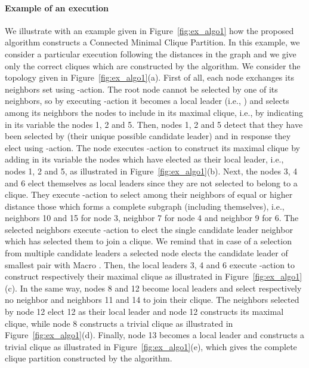 \documentclass[11pt,letterpaper,onecolumn]{article}
\begin{document}
\paragraph{Example of an execution}

We illustrate with an example given in Figure~\ref{fig:ex_algo1} how the proposed algorithm  constructs a Connected Minimal Clique Partition. In this example, we consider a particular execution following the distances in the graph and we give only the correct cliques which are constructed by the algorithm. We consider the topology given in Figure~\ref{fig:ex_algo1}(a). First of all, each node exchanges its neighbors set using -action. The root node  cannot be selected by one of its neighbors, so by executing -action it becomes a local leader (i.e., ) and selects among its neighbors the nodes to include in its maximal clique, i.e., by indicating in its variable  the nodes 1, 2 and 5. Then, nodes 1, 2 and 5 detect that they have been selected by  (their unique possible candidate leader) and in response they elect  using -action. The node  executes -action to construct its maximal clique by adding in its variable  the nodes which have elected  as their local leader, i.e., nodes 1, 2 and 5, as illustrated in Figure~\ref{fig:ex_algo1}(b). Next, the nodes 3, 4 and 6 elect themselves as local leaders since they are not selected to belong to a clique. They execute -action to select among their neighbors of equal or higher distance those which forms a complete subgraph (including themselves), i.e., neighbors 10 and 15 for node 3, neighbor 7 for node 4 and neighbor 9 for 6. The selected neighbors execute -action to elect the single candidate leader neighbor which has selected them to join a clique. We remind that in case of a selection from multiple candidate leaders a selected node elects the candidate leader  of smallest pair  with Macro . Then, the local leaders 3, 4 and 6 execute -action to construct respectively their maximal clique as illustrated in Figure~\ref{fig:ex_algo1}(c). In the same way, nodes 8 and 12 become local leaders and select respectively no neighbor and neighbors 11 and 14 to join their clique. The neighbors selected by node 12 elect 12 as their local leader and node 12 constructs its maximal clique, while node 8 constructs a trivial clique as illustrated in Figure~\ref{fig:ex_algo1}(d). Finally, node 13 becomes a local leader and constructs a trivial clique as illustrated in Figure~\ref{fig:ex_algo1}(e), which gives the complete clique partition constructed by the algorithm.
\end{document}
